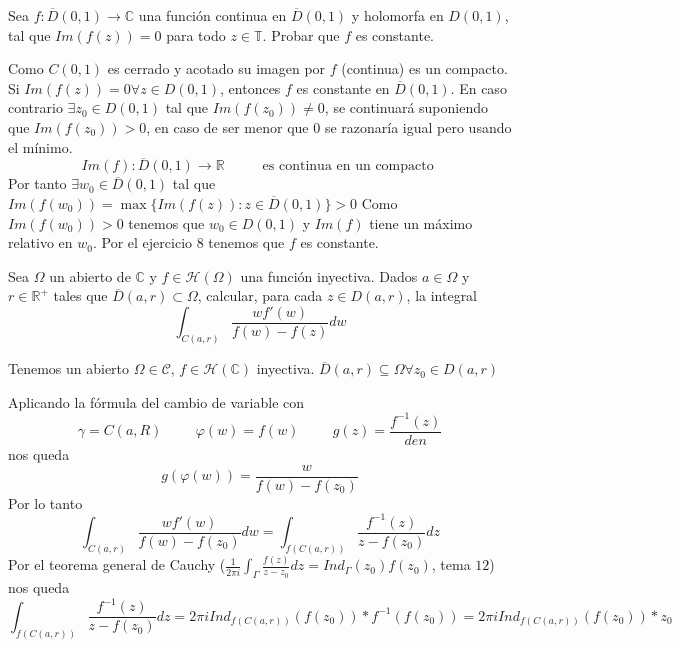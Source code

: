 \begin{ejer}
	Sea $f:\overline{D}(0,1)\rightarrow\mathbb{C}$ una función continua en $\overline{D}(0,1)$ y holomorfa en $D(0,1)$, tal que $Im(f(z)) = 0$ para todo $z\in\mathbb{T}$.
	Probar que $f$ es constante.
\end{ejer}
\begin{sol}
Como $C(0,1)$ es cerrado y acotado su imagen por $f$ (continua) es un compacto.
Si $Im(f(z))=0 	\forall z\in D(0,1)$, entonces $f$ es constante en $\overline{D}(0,1)$.
En caso contrario $\exists z_0 \in D(0,1)$ tal que $Im(f(z_0)) \not=0$, se continuará suponiendo que $Im(f(z_0))>0$, en caso de ser menor que $0$ se razonaría igual pero usando el mínimo.
$$Im(f):\overline{D}(0,1)\rightarrow \mathbb{R} \hspace{1cm} \text{ es continua en un compacto }$$
Por tanto $\exists w_0\in\overline{D}(0,1)$ tal que $Im(f(w_0)) = \max\{ Im(f(z)) : z\in\overline{D}(0,1) \} > 0$
Como $Im(f(w_0))>0$ tenemos que $w_0\in D(0,1)$ y $Im(f)$ tiene un máximo relativo en $w_0$.
Por el ejercicio $8$ tenemos que $f$ es constante.
\end{sol}


\begin{ejer}
	Sea $\Omega$ un abierto de $\mathbb{C}$ y $f\in\mathcal{H}(\Omega)$ una función inyectiva. 
	Dados $a\in\Omega$ y $r\in\mathbb{R}^+$ tales que $\overline{D}(a,r)\subset\Omega$, calcular, para cada $z\in D(a,r)$, la integral
	$$ \int_{C(a,r)} \frac{wf'(w)}{f(w)-f(z)} dw $$
\end{ejer}
\begin{sol}
Tenemos un abierto $\Omega\in\mathcal{C}$, $f\in\mathcal{H}(\mathbb{C})$ inyectiva.
$\overline{D}(a,r) \subseteq \Omega \forall z_0\in D(a,r)$

Aplicando la fórmula del cambio de variable con 
$$\gamma = C(a,R)\hspace{1cm} \varphi(w) = f(w) \hspace{1cm} g(z) = \frac{f^{-1}(z)}{den}$$
nos queda
$$g(\varphi(w)) = \frac{w}{f(w)-f(z_0)}$$
Por lo tanto
$$\int_{C(a,r)} \frac{wf'(w)}{f(w)-f(z_0)} dw = \int_{f(C(a,r))} \frac{f^{-1}(z)}{z-f(z_0)} dz$$
Por el teorema general de Cauchy ($\frac{1}{2\pi i} \int_{\Gamma}\frac{f(z)}{z-z_0} dz = Ind_{\Gamma} (z_0)f(z_0)$, tema $12$) nos queda
$$\int_{f(C(a,r))} \frac{f^{-1}(z)}{z-f(z_0)} dz = 2\pi i Ind_{f(C(a,r))} (f(z_0)) * f^{-1}(f(z_0)) = 2\pi i Ind_{f(C(a,r))} (f(z_0)) * z_0$$
\end{sol}